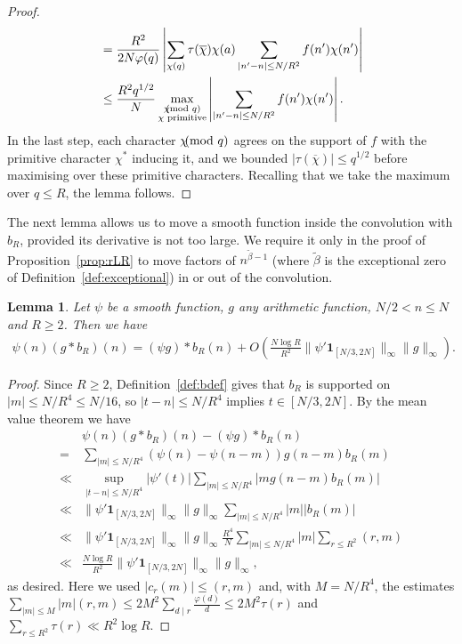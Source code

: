 \documentclass[12pt]{amsart}
\newtheorem{lemma}[theorem]{Lemma}
\theoremstyle{definition}
\theoremstyle{remark}
\numberwithin{equation}{section}
\newcommand{\1}{\mathbf{1}}
\let\oldpmod\pmod
\renewcommand{\pmod}[1]{\hspace{-0.12cm}\oldpmod {#1}}
\begin{document}
\begin{proof}
\begin{align*}
    &=\frac{R^2 }{2 N\varphi(q)} \left|\sum_{\chi(q)} \tau(\overline{\chi})\chi(a)\sum_{|n'-n|\leq N/R^2}f(n')\chi(n') \right|\\
    &\leq \frac{R^2 q^{1/2} }{N} \max_{\substack{\chi\pmod q\\ \chi \textnormal{ primitive}}}\left|\sum_{|n'-n|\leq N/R^2}f(n')\chi(n') \right|.
\end{align*}
In the last step, each character $\chi\pmod q$ agrees on the support of $f$ with the primitive character $\chi^\ast$ inducing it, and we bounded $|\tau(\overline{\chi})|\leq q^{1/2}$ before maximising over these primitive characters.
Recalling that we take the maximum over $q\leq R$, the lemma follows.
\end{proof}



The next lemma allows us to move a smooth function inside the convolution with $b_R$, provided its derivative is not too large. We require it only in the proof of Proposition~\ref{prop:rLR} to move factors of $n^{\widetilde{\beta}-1}$ (where $\widetilde\beta$ is the exceptional zero of Definition~\ref{def:exceptional}) in or out of the convolution.


\begin{lemma}\label{le:smoothconvo}
    Let $\psi$ be a smooth function, $g$ any arithmetic function, $N/2 <n\leq N$ and $R\geq 2$. Then we have
    \begin{align*}
        \psi(n)(g*b_R)(n)=(\psi g)*b_R(n)+O\left(\frac{N \log R}{R^2} \|\psi'\1_{[N/3,2N]}\|_\infty \|g\|_{\infty}\right).
    \end{align*}
\end{lemma}
\begin{proof}
    Since $R\geq 2$, Definition~\ref{def:bdef} gives that $b_R$ is supported on $|m|\leq N/R^4\leq N/16$, so $|t-n|\leq N/R^4$ implies $t\in [N/3,2N]$. By the mean value theorem we have
      \begin{align*}
        &\psi(n)(g*b_R)(n)-(\psi g)*b_R(n)\\
        =&\sum_{|m|\leq N/R^4}(\psi(n)-\psi(n-m))g(n-m)b_R(m)\\
        \ll&  \sup_{|t-n|\leq N/R^4} |\psi'(t)| \sum_{|m|\leq N/R^4}  |m g(n-m) b_R(m)| \\
        \ll&  \|\psi'\1_{[N/3,2N]}\|_\infty \|g\|_{\infty}\sum_{|m|\leq N/R^4} |m| |b_R(m)|\\
        \ll&  \|\psi'\1_{[N/3,2N]}\|_\infty \|g\|_{\infty} \frac{R^4}{N} \sum_{|m|\leq N/R^4} |m| \sum_{r\leq R^2} (r,m)\\
        \ll& \frac{N \log R}{R^2} \|\psi'\1_{[N/3,2N]}\|_\infty \|g\|_{\infty},
    \end{align*}
    as desired. Here we used $|c_r(m)|\leq (r,m)$ and, with $M=N/R^4$, the estimates $\sum_{|m|\leq M}|m|(r,m)\leq 2M^2\sum_{d\mid r}\frac{\varphi(d)}{d}\leq 2M^2\tau(r)$ and $\sum_{r\leq R^2}\tau(r)\ll R^2\log R$.
\end{proof}
\end{document}
